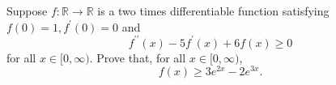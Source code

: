Suppose \(f\colon \mathbb{R}\to \mathbb{R}\) is a two times differentiable function satisfying \(f(0)=1, f^{\prime}(0)=0\) and
\[ f^{\prime \prime}(x)-5f^{\prime}(x)+6f(x)\ge 0 \]
for all \(x\in [0,\infty)\).
Prove that, for all \(x\in [0,\infty)\),
\[ f(x)\ge 3e^{2x}-2e^{3x}. \]